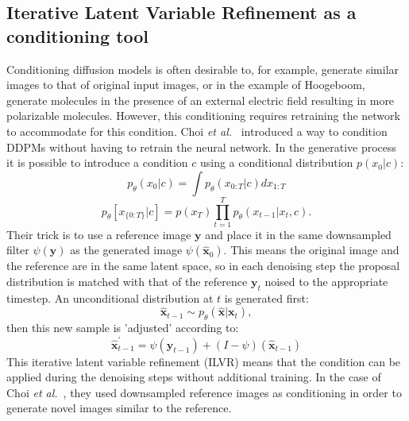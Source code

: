 \documentclass[journal=jacsat,manuscript=article]{achemso}
\begin{document}
\subsection{Iterative Latent Variable Refinement as a conditioning tool}
Conditioning diffusion models is often desirable to, for example, generate similar images to that of original input images, or in the example of Hoogeboom, generate molecules in the presence of an external electric field resulting in more polarizable molecules. However, this conditioning requires retraining the network to accommodate for this condition. Choi \textit{et al.}~\cite{choi2021ilvr} introduced a way to condition DDPMs without having to retrain the neural network. In the generative process it is possible to introduce a condition $c$ using a conditional distribution $p(x_0|c)$:
\begin{equation}
    p_\theta(x_0|c) = \int p_\theta(x_{0:T}|c)dx_{1:T}
\end{equation}
\begin{equation}
    p_{\theta}[x_{\{0:T\}}|c]=p(x_T)\prod_{t=1}^{T}p_{\theta}(x_{t-1}|x_t,c).
\end{equation}
Their trick is to use a reference image $\mathbf{y}$ and place it in the same downsampled filter $\psi(\mathbf{y})$ as the generated image $\psi(\mathbf{\hat{x}}_0)$. This means the original image and the reference are  in the same latent space, so in each denoising step the proposal distribution is matched with that of the reference $\mathbf{y}_t$ noised  to the appropriate timestep. An unconditional distribution at $t$ is generated first:
\begin{equation}
\mathbf{\hat{x}}_{t-1} \sim p_{\theta}( \mathbf{\hat{x}}|\mathbf{x}_t),
\end{equation}
then this  new sample is 'adjusted' according to:
\begin{equation}
    \mathbf{\hat{x}}^{\prime}_{t-1} = \psi(\mathbf{y}_{t-1}) + (I-\psi)(\mathbf{\hat{x}}_{t-1})
\end{equation}
This iterative latent variable refinement (ILVR) means that the condition can be applied during the denoising steps without additional training. In the case of Choi \textit{et al.}~\cite{choi2021ilvr}, they used downsampled reference images as conditioning in order to generate novel images similar to the reference. 

\end{document}
